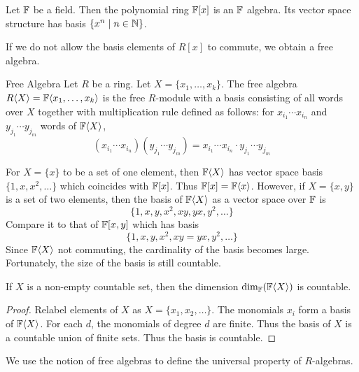 \documentclass[a4paper]{article}
\begin{document}
\begin{prp}{}{} Let $\mathbb{F}$ be a field. Then the polynomial ring $\mathbb{F}[x]$ is an $\mathbb{F}$ algebra. Its vector space structure has basis $\{x^n\;|\;n\in\mathbb{N}\}$. 
\end{prp}

If we do not allow the basis elements of $R[x]$ to commute, we obtain a free algebra. 

\begin{defn}{Free Algebra}{} Let $R$ be a ring. Let $X=\{x_1,\dots,x_k\}$. The free algebra $R\langle X\rangle=\mathbb{F}\langle x_1,\dots,x_k\rangle$ is the free $R$-module with a basis consisting of all words over $X$ together with multiplication rule defined as follows: for $x_{i_1}\cdots x_{i_n}$ and $y_{j_1}\cdots y_{j_m}$ words of $\mathbb{F}\langle X\rangle$, $$(x_{i_1}\cdots x_{i_n})(y_{j_1}\cdots y_{j_m})=x_{i_1}\cdots x_{i_n}\cdot y_{j_1}\cdots y_{j_m}$$
\end{defn}

For $X=\{x\}$ to be a set of one element, then $\mathbb{F}\langle X\rangle$ has vector space basis $\{1,x,x^2,\dots\}$ which coincides with $\mathbb{F}[x]$. Thus $\mathbb{F}[x]=\mathbb{F}\langle x\rangle$. However, if $X=\{x,y\}$ is a set of two elements, then the basis of $\mathbb{F}\langle X\rangle$ as a vector space over $\mathbb{F}$ is $$\{1,x,y,x^2,xy,yx,y^2,\dots\}$$ Compare it to that of $\mathbb{F}[x,y]$ which has basis $$\{1,x,y,x^2,xy=yx,y^2,\dots\}$$ Since $\mathbb{F}\langle X\rangle$ not commuting, the cardinality of the basis becomes large. Fortunately, the size of the basis is still countable. 

\begin{prp}{}{} If $X$ is a non-empty countable set, then the dimension $\dim_{\mathbb{F}}(\mathbb{F}\langle X\rangle)$ is countable. \tcbline
\begin{proof}
Relabel elements of $X$ as $X=\{x_1,x_2,\dots\}$. The monomials $x_i$ form a basis of $\mathbb{F}\langle X\rangle$. For each $d$, the monomials of degree $d$ are finite. Thus the basis of $X$ is a countable union of finite sets. Thus the basis is countable. 
\end{proof}
\end{prp}

We use the notion of free algebras to define the universal property of $R$-algebras. 
\end{document}
